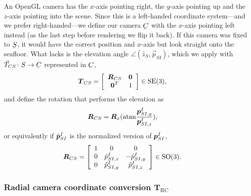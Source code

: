 An OpenGL camera has the $x$-axis pointing right, the $y$-axis pointing up and the $z$-axis pointing into the scene. Since this is a left-handed coordinate system---and we prefer right-handed---we define our camera $\ubar{C}$ with the $x$-axis pointing left instead (as the last step before rendering we flip it back). If this camera was fixed to $\ubar{S}$, it would have the correct position and $x$-axis but look straight onto the seafloor. What lacks is the elevation angle $\angle(\hat{z}_S,\vec{p}_{SI})$, which we apply with $\vec{T}_{CS}\colon \udot{S}\to\udot{C}$ represented in $\ubar{C}$,
%
%
%
\begin{align}
\dvec{T}_{CS} &= 
\left[\begin{array}{c c}
 \mat{R}_{CS}  & \dvec{0} \\%
 \dvec{0}^T  &  1
\end{array}\right] \in \mathrm{SE}(3), \label{eq_T_CS}
\end{align}
%
and define the rotation that performs the elevation as
%
\begin{align}
\dvec{R}_{CS} &= \mat{R}_x(\mathrm{atan}\frac{\dvec{p}_{SI,y}^I}{\dvec{p}_{SI,z}^I}),\label{eq_R_CS_angle}
\end{align}
%
or equivalently if $\hat{\boldsymbol{p}}_{SI}^I$ is the normalized version of $\boldsymbol{p}_{SI}^I$,
%
\begin{align}
\dvec{R}_{CS} &=
\left[\begin{array}{c c c}
 1 & 0                 & 0                 \\%
 0 & \hat{{p}}_{SI,z}^I & -\hat{{p}}_{SI,y}^I \\
 0 & \hat{{p}}_{SI,y}^I &  \hat{{p}}_{SI,z}^I 
\end{array}\right] \in \mathrm{SO}(3). \label{eq_R_CS_coordinate}
\end{align}


\subsubsection{Radial camera coordinate conversion T$_{\mathrm{RC}}$}\label{IV_sec_radial_camera}


